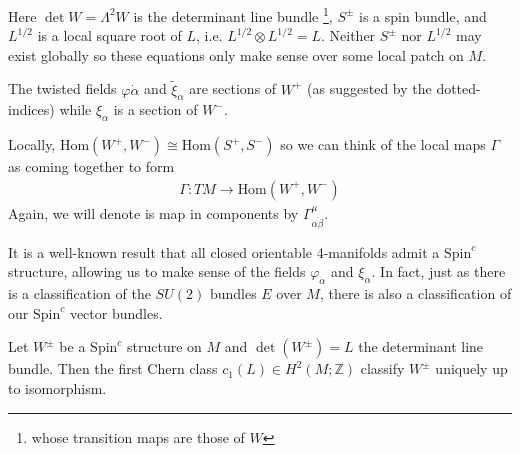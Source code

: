 \documentclass[12pt, onecolumn]{article}
\newenvironment{remark}[1][Remark]{\begin{trivlist}
\item[\hskip \labelsep {\bfseries #1}]}{\end{trivlist}}
\begin{document}
\begin{remark}
Here $\det W=\Lambda^2 W$ is the determinant line bundle \footnote{whose transition maps are those of $W$}, $S^{\pm}$ is a spin bundle, and $L^{1/2}$ is a local square root of $L$, i.e. $L^{1/2} \otimes L^{1/2} = L$.  Neither $S^{\pm}$ nor $L^{1/2}$ may exist globally so these equations only make sense over some local patch on $M$.
\end{remark}

\begin{remark}
The twisted fields $\varphi{\dot{\alpha}}$ and $\widetilde{\xi}_{\dot{\alpha}}$ are sections of $W^{+}$ (as suggested by the dotted-indices) while $\xi_{\alpha}$ is a section of $W^{-}$.
\end{remark}

\begin{remark}
Locally, $\text{Hom}(W^{+},W^{-}) \cong \text{Hom}(S^{+},S^{-})$ so we can think of the local maps $\Gamma$ as coming together to form 
\begin{align*}
\Gamma: TM \rightarrow \text{Hom}\left(W^{+},W^{-}\right)
\end{align*}
Again, we will denote is map in components by $\Gamma^{\mu}_{\alpha \dot{\beta}}$.
\end{remark}

\noindent It is a well-known result that all closed orientable 4-manifolds admit a $\text{Spin}^{c}$ structure, allowing us to make sense of the fields $\varphi_{\dot{\alpha}}$ and $\xi_{\alpha}$.  In fact, just as there is a classification of the $SU(2)$ bundles $E$ over $M$, there is also a classification of our $\text{Spin}^{c}$ vector bundles.

\begin{remark}
Let $W^{\pm}$ be a $\text{Spin}^{c}$ structure on $M$ and $\det(W^{\pm})=L$ the determinant line bundle.  Then the first Chern class $c_{1}(L) \in H^{2}(M;\mathbb{Z})$ classify $W^{\pm}$ uniquely up to isomorphism.
\end{remark}
\end{document}

